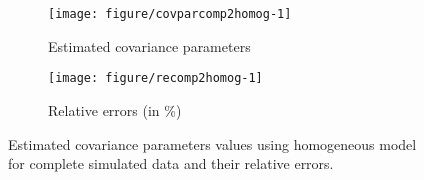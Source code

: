 \begin{figure}[t]
 \begin{subfigure}{\textwidth}
  \centering
\begin{knitrout}
\color{fgcolor}
\texttt{[image: figure/covparcomp2homog-1]} 

\end{knitrout}
    \caption{Estimated covariance parameters} \label{fig:cpest-comp2homog}
   \end{subfigure}
  \begin{subfigure}{\textwidth}
  \centering
\begin{knitrout}
\color{fgcolor}
\texttt{[image: figure/recomp2homog-1]} 

\end{knitrout}
   \caption{Relative errors (in \%) }\label{fig:re-comp2homog}
 \end{subfigure}
 \caption{Estimated covariance parameters values using homogeneous model for complete simulated data and their relative errors.}
  \label{fig:cp-comp2homog}
\end{figure}  


